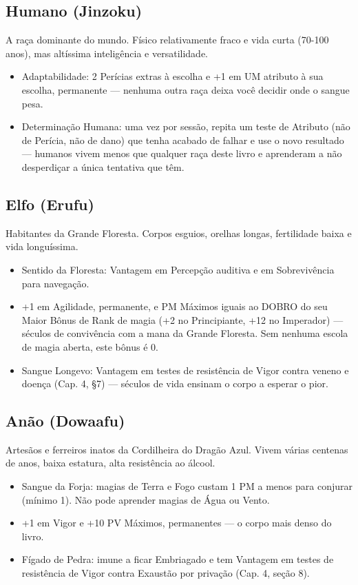 \subsection{Humano (Jinzoku)}
A raça dominante do mundo. Físico relativamente fraco e vida curta (70-100 anos), mas altíssima inteligência e versatilidade.

\begin{itemize}
  \item Adaptabilidade: 2 Perícias extras à escolha e +1 em UM atributo à sua escolha, permanente --- nenhuma outra raça deixa você decidir onde o sangue pesa.
  \item Determinação Humana: uma vez por sessão, repita um teste de Atributo (não de Perícia, não de dano) que tenha acabado de falhar e use o novo resultado --- humanos vivem menos que qualquer raça deste livro e aprenderam a não desperdiçar a única tentativa que têm.
\end{itemize}

\subsection{Elfo (Erufu)}
Habitantes da Grande Floresta. Corpos esguios, orelhas longas, fertilidade baixa e vida longuíssima.

\begin{itemize}
  \item Sentido da Floresta: Vantagem em Percepção auditiva e em Sobrevivência para navegação.
  \item +1 em Agilidade, permanente, e PM Máximos iguais ao DOBRO do seu Maior Bônus de Rank de magia (+2 no Principiante, +12 no Imperador) --- séculos de convivência com a mana da Grande Floresta. Sem nenhuma escola de magia aberta, este bônus é 0.
  \item Sangue Longevo: Vantagem em testes de resistência de Vigor contra veneno e doença (Cap. 4, §7) --- séculos de vida ensinam o corpo a esperar o pior.
\end{itemize}

\subsection{Anão (Dowaafu)}
Artesãos e ferreiros inatos da Cordilheira do Dragão Azul. Vivem várias centenas de anos, baixa estatura, alta resistência ao álcool.

\begin{itemize}
  \item Sangue da Forja: magias de Terra e Fogo custam 1 PM a menos para conjurar (mínimo 1). Não pode aprender magias de Água ou Vento.
  \item +1 em Vigor e +10 PV Máximos, permanentes --- o corpo mais denso do livro.
  \item Fígado de Pedra: imune a ficar Embriagado e tem Vantagem em testes de resistência de Vigor contra Exaustão por privação (Cap. 4, seção 8).
\end{itemize}

